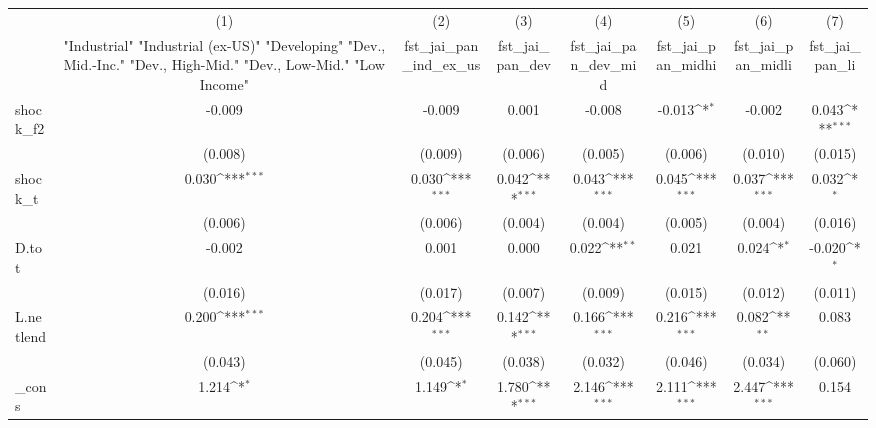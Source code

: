 {
\def\sym#1{\ifmmode^{#1}\else\(^{#1}\)\fi}
\begin{tabular}{l*{7}{c}}
\toprule
            &\multicolumn{1}{c}{(1)}&\multicolumn{1}{c}{(2)}&\multicolumn{1}{c}{(3)}&\multicolumn{1}{c}{(4)}&\multicolumn{1}{c}{(5)}&\multicolumn{1}{c}{(6)}&\multicolumn{1}{c}{(7)}\\
            &\multicolumn{1}{c}{ "Industrial" "Industrial (ex-US)" "Developing" "Dev., Mid.-Inc." "Dev., High-Mid."  "Dev., Low-Mid." "Low Income" }&\multicolumn{1}{c}{fst\_jai\_pan\_ind\_ex\_us}&\multicolumn{1}{c}{fst\_jai\_pan\_dev}&\multicolumn{1}{c}{fst\_jai\_pan\_dev\_mid}&\multicolumn{1}{c}{fst\_jai\_pan\_midhi}&\multicolumn{1}{c}{fst\_jai\_pan\_midli}&\multicolumn{1}{c}{fst\_jai\_pan\_li}\\
\midrule
shock\_f2    &      -0.009         &      -0.009         &       0.001         &      -0.008         &      -0.013\sym{*}  &      -0.002         &       0.043\sym{***}\\
            &     (0.008)         &     (0.009)         &     (0.006)         &     (0.005)         &     (0.006)         &     (0.010)         &     (0.015)         \\
\addlinespace
shock\_t     &       0.030\sym{***}&       0.030\sym{***}&       0.042\sym{***}&       0.043\sym{***}&       0.045\sym{***}&       0.037\sym{***}&       0.032\sym{*}  \\
            &     (0.006)         &     (0.006)         &     (0.004)         &     (0.004)         &     (0.005)         &     (0.004)         &     (0.016)         \\
\addlinespace
D.tot       &      -0.002         &       0.001         &       0.000         &       0.022\sym{**} &       0.021         &       0.024\sym{*}  &      -0.020\sym{*}  \\
            &     (0.016)         &     (0.017)         &     (0.007)         &     (0.009)         &     (0.015)         &     (0.012)         &     (0.011)         \\
\addlinespace
L.netlend   &       0.200\sym{***}&       0.204\sym{***}&       0.142\sym{***}&       0.166\sym{***}&       0.216\sym{***}&       0.082\sym{**} &       0.083         \\
            &     (0.043)         &     (0.045)         &     (0.038)         &     (0.032)         &     (0.046)         &     (0.034)         &     (0.060)         \\
\addlinespace
\_cons      &       1.214\sym{*}  &       1.149\sym{*}  &       1.780\sym{***}&       2.146\sym{***}&       2.111\sym{***}&       2.447\sym{***}&       0.154         \\

\end{tabular}}
